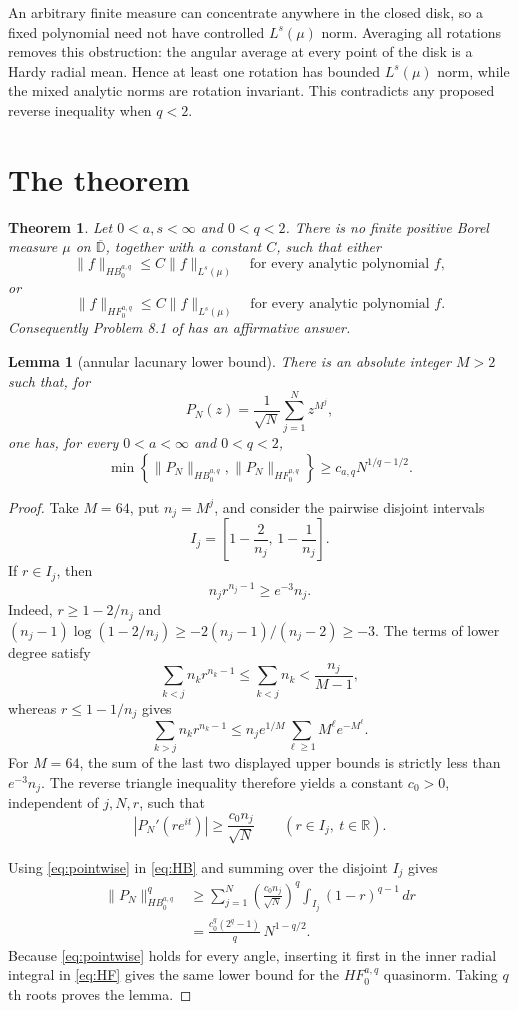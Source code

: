 \documentclass[11pt]{article}
\newtheorem{theorem}{Theorem}
\newtheorem{lemma}{Lemma}
\newcommand{\olD}{\overline{\mathbb D}}
\begin{document}
An arbitrary finite measure can concentrate anywhere in the closed disk, so a
fixed polynomial need not have controlled $L^s(\mu)$ norm.  Averaging all
rotations removes this obstruction: the angular average at every point of the
disk is a Hardy radial mean.  Hence at least one rotation has bounded
$L^s(\mu)$ norm, while the mixed analytic norms are rotation invariant.  This
contradicts any proposed reverse inequality when $q<2$.

\section{The theorem}

\begin{theorem}\label{thm:main}
Let $0<a,s<\infty$ and $0<q<2$.  There is no finite positive Borel measure
$\mu$ on $\olD$, together with a constant $C$, such that either
\[
 \|f\|_{HB^{a,q}_0}\le C\|f\|_{L^s(\mu)}
 \quad\text{for every analytic polynomial }f,
 \tag{B}
\]
or
\[
 \|f\|_{HF^{a,q}_0}\le C\|f\|_{L^s(\mu)}
 \quad\text{for every analytic polynomial }f.
 \tag{F}
\]
Consequently Problem 8.1 of \cite{DTV} has an affirmative answer.
\end{theorem}

\begin{lemma}[annular lacunary lower bound]\label{lem:lower}
There is an absolute integer $M>2$ such that, for
\[
 P_N(z)=\frac1{\sqrt N}\sum_{j=1}^N z^{M^j},
 \]
one has, for every $0<a<\infty$ and $0<q<2$,
\[
 \min\!\left\{\|P_N\|_{HB^{a,q}_0},\|P_N\|_{HF^{a,q}_0}\right\}
 \ge c_{a,q}N^{1/q-1/2}.
\]
\end{lemma}

\begin{proof}
Take $M=64$, put $n_j=M^j$, and consider the pairwise disjoint intervals
\[
 I_j=\left[1-\frac{2}{n_j},\,1-\frac{1}{n_j}\right].
\]
If $r\in I_j$, then
\[
 n_jr^{n_j-1}\ge e^{-3}n_j.
\]
Indeed, $r\ge1-2/n_j$ and
$(n_j-1)\log(1-2/n_j)\ge-2(n_j-1)/(n_j-2)\ge-3$.
The terms of lower degree satisfy
\[
 \sum_{k<j}n_kr^{n_k-1}\le\sum_{k<j}n_k<\frac{n_j}{M-1},
\]
whereas $r\le1-1/n_j$ gives
\[
 \sum_{k>j}n_kr^{n_k-1}
 \le n_j e^{1/M}\sum_{\ell\ge1}M^\ell e^{-M^\ell}.
\]
For $M=64$, the sum of the last two displayed upper bounds is strictly less
than $e^{-3}n_j$.  The reverse triangle inequality therefore yields a
constant $c_0>0$, independent of $j,N,r$, such that
\[
 |P_N'(re^{it})|\ge \frac{c_0n_j}{\sqrt N}
 \qquad(r\in I_j,\ t\in\mathbb R). \label{eq:pointwise}
\]

Using \eqref{eq:pointwise} in \eqref{eq:HB} and summing over the disjoint
$I_j$ gives
\begin{align*}
 \|P_N\|_{HB^{a,q}_0}^q
 &\ge \sum_{j=1}^N\left(\frac{c_0n_j}{\sqrt N}\right)^q
 \int_{I_j}(1-r)^{q-1}\,dr\\
 &=\frac{c_0^q(2^q-1)}q\,N^{1-q/2}.
\end{align*}
Because \eqref{eq:pointwise} holds for every angle, inserting it first in the
inner radial integral in \eqref{eq:HF} gives the same lower bound for the
$HF^{a,q}_0$ quasinorm.  Taking $q$th roots proves the lemma.
\end{proof}
\end{document}
